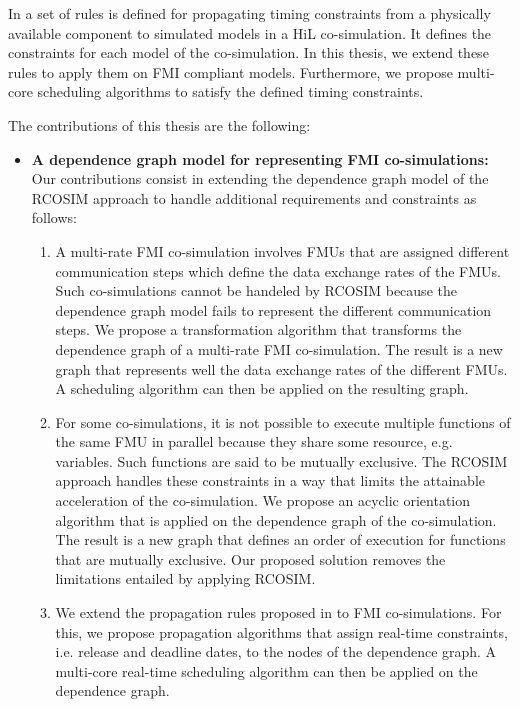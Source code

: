 In \cite{faure:2011} a set of rules is defined for propagating timing constraints from a physically available component to simulated models in a HiL co-simulation. It defines the constraints for each model of the co-simulation. In this thesis, we extend these rules to apply them on FMI compliant models. Furthermore, we propose multi-core scheduling algorithms to satisfy the defined timing constraints.

The contributions of this thesis are the following:

\begin{itemize}

\item \textbf{A dependence graph model for representing FMI co-simulations:} Our contributions consist in extending the dependence graph model of the RCOSIM approach to handle additional requirements and constraints as follows:

\begin{enumerate}

\item A multi-rate FMI co-simulation involves FMUs that are assigned different communication steps which define the data exchange rates of the FMUs. Such co-simulations cannot be handeled by RCOSIM because the dependence graph model fails to represent the different communication steps. We propose a transformation algorithm that transforms the dependence graph of a multi-rate FMI co-simulation. The result is a new graph that represents well the data exchange rates of the different FMUs. A scheduling algorithm can then be applied on the resulting graph.

\item For some co-simulations, it is not possible to execute multiple functions of the same FMU in parallel because they share some resource, e.g. variables. Such functions are said to be mutually exclusive. The RCOSIM approach handles these constraints in a way that limits the attainable acceleration of the co-simulation. We propose an acyclic orientation algorithm that is applied on the dependence graph of the co-simulation. The result is a new graph that defines an order of execution for functions that are mutually exclusive. Our proposed solution removes the limitations entailed by applying RCOSIM.

\item We extend the propagation rules proposed in \cite{faure:2011} to FMI co-simulations. For this, we propose propagation algorithms that assign real-time constraints, i.e. release and deadline dates, to the nodes of the dependence graph. A multi-core real-time scheduling algorithm can then be applied on the dependence graph.


\end{enumerate}
\end{itemize}
